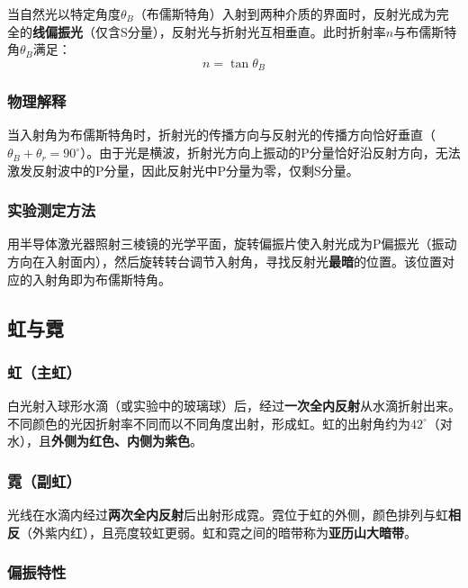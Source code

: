 \documentclass[UTF8]{article}
\begin{document}
当自然光以特定角度$\theta_B$（布儒斯特角）入射到两种介质的界面时，反射光成为完全的\textbf{线偏振光}（仅含S分量），反射光与折射光互相垂直。此时折射率$n$与布儒斯特角$\theta_B$满足：
\begin{equation}
\boxed{n = \tan\theta_B}
\label{eq:brewster}
\end{equation}

\subsubsection{物理解释}

当入射角为布儒斯特角时，折射光的传播方向与反射光的传播方向恰好垂直（$\theta_B + \theta_r = 90^\circ$）。由于光是横波，折射光方向上振动的P分量恰好沿反射方向，无法激发反射波中的P分量，因此反射光中P分量为零，仅剩S分量。

\subsubsection{实验测定方法}

用半导体激光器照射三棱镜的光学平面，旋转偏振片使入射光成为P偏振光（振动方向在入射面内），然后旋转转台调节入射角，寻找反射光\textbf{最暗}的位置。该位置对应的入射角即为布儒斯特角。

\subsection{虹与霓}

\subsubsection{虹（主虹）}

白光射入球形水滴（或实验中的玻璃球）后，经过\textbf{一次全内反射}从水滴折射出来。不同颜色的光因折射率不同而以不同角度出射，形成虹。虹的出射角约为$42^\circ$（对水），且\textbf{外侧为红色、内侧为紫色}。

\subsubsection{霓（副虹）}

光线在水滴内经过\textbf{两次全内反射}后出射形成霓。霓位于虹的外侧，颜色排列与虹\textbf{相反}（外紫内红），且亮度较虹更弱。虹和霓之间的暗带称为\textbf{亚历山大暗带}。

\subsubsection{偏振特性}
\end{document}
